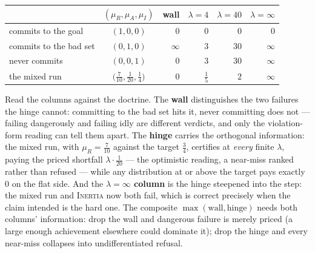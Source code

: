 \begin{center}
\begin{tabular}{@{}lcrrrr@{}}
\toprule
& $(\mu_R, \mu_A, \mu_I)$
& \multicolumn{1}{c}{wall}
& \multicolumn{1}{c}{$\lambda = 4$}
& \multicolumn{1}{c}{$\lambda = 40$}
& \multicolumn{1}{c}{$\lambda = \infty$} \\
\midrule
commits to the goal    & $(1, 0, 0)$ & $0$ & $0$ & $0$ & $0$ \\
commits to the bad set & $(0, 1, 0)$ & $\infty$ & $3$ & $30$ & $\infty$ \\
never commits          & $(0, 0, 1)$ & $0$ & $3$ & $30$ & $\infty$ \\
the mixed run          & $\bigl(\tfrac{7}{10}, \tfrac1{20}, \tfrac14\bigr)$
                       & $0$ & $\tfrac15$ & $2$ & $\infty$ \\
\bottomrule
\end{tabular}
\end{center}

\noindent Read the columns against the doctrine. The \textbf{wall}
distinguishes the two failures the hinge cannot: committing to the
bad set hits it, never committing does not --- failing dangerously
and failing idly are different verdicts, and only the
violation-form reading can tell them apart. The \textbf{hinge}
carries the orthogonal information: the mixed run, with
$\mu_R = \tfrac{7}{10}$ against the target $\tfrac34$, certifies at
\emph{every} finite $\lambda$, paying the priced shortfall
$\lambda \cdot \tfrac1{20}$ --- the optimistic reading, a near-miss
ranked rather than refused --- while any distribution at or above
the target pays exactly $0$ on the flat side. And the
\textbf{$\lambda = \infty$ column} is the hinge steepened into the
step: the mixed run and \textsc{Inertia} now both fail, which is
correct precisely when the claim intended is the hard one. The
composite $\max(\mathrm{wall}, \mathrm{hinge})$ needs both columns'
information: drop the wall and dangerous failure is merely priced
(a large enough achievement elsewhere could dominate it); drop the
hinge and every near-miss collapses into undifferentiated refusal.

